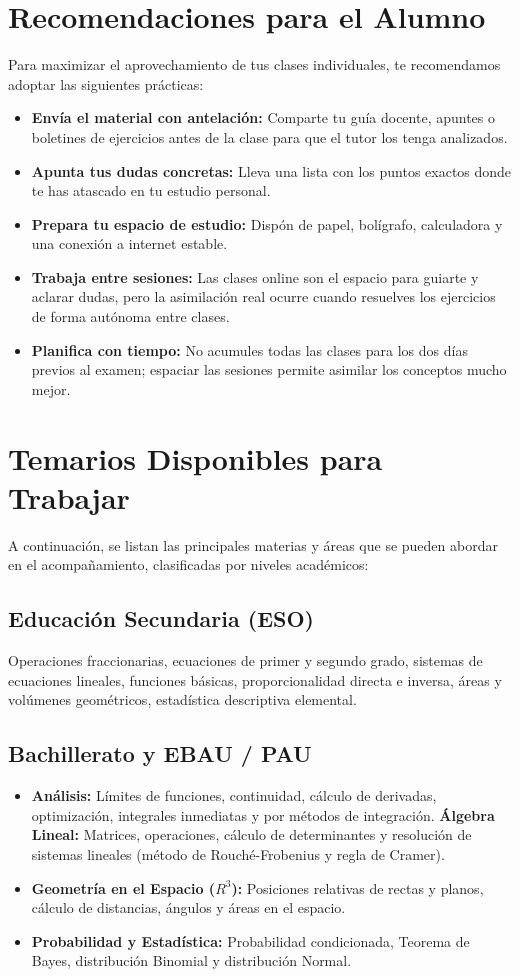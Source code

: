 \documentclass[11pt,a4paper]{article}
\begin{document}
\newpage
\section{Recomendaciones para el Alumno}
Para maximizar el aprovechamiento de tus clases individuales, te recomendamos adoptar las siguientes prácticas:
\begin{itemize}
    \item \textbf{Envía el material con antelación:} Comparte tu guía docente, apuntes o boletines de ejercicios antes de la clase para que el tutor los tenga analizados.
    \item \textbf{Apunta tus dudas concretas:} Lleva una lista con los puntos exactos donde te has atascado en tu estudio personal.
    \item \textbf{Prepara tu espacio de estudio:} Dispón de papel, bolígrafo, calculadora y una conexión a internet estable.
    \item \textbf{Trabaja entre sesiones:} Las clases online son el espacio para guiarte y aclarar dudas, pero la asimilación real ocurre cuando resuelves los ejercicios de forma autónoma entre clases.
    \item \textbf{Planifica con tiempo:} No acumules todas las clases para los dos días previos al examen; espaciar las sesiones permite asimilar los conceptos mucho mejor.
\end{itemize}

\section{Temarios Disponibles para Trabajar}
A continuación, se listan las principales materias y áreas que se pueden abordar en el acompañamiento, clasificadas por niveles académicos:

\subsection{Educación Secundaria (ESO)}
Operaciones fraccionarias, ecuaciones de primer y segundo grado, sistemas de ecuaciones lineales, funciones básicas, proporcionalidad directa e inversa, áreas y volúmenes geométricos, estadística descriptiva elemental.

\subsection{Bachillerato y EBAU / PAU}
\begin{itemize}
    \item \textbf{Análisis:} Límites de funciones, continuidad, cálculo de derivadas, optimización, integrales inmediatas y por métodos de integración.
    \textbf{Álgebra Lineal:} Matrices, operaciones, cálculo de determinantes y resolución de sistemas lineales (método de Rouché-Frobenius y regla de Cramer).
    \item \textbf{Geometría en el Espacio ($R^3$):} Posiciones relativas de rectas y planos, cálculo de distancias, ángulos y áreas en el espacio.
    \item \textbf{Probabilidad y Estadística:} Probabilidad condicionada, Teorema de Bayes, distribución Binomial y distribución Normal.
\end{itemize}
\end{document}
